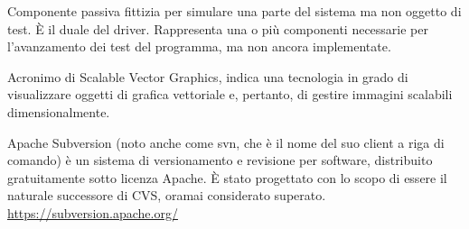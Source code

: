 Componente passiva fittizia per simulare una parte del sistema ma non oggetto di test. \`{E} il duale del driver. Rappresenta una o più componenti necessarie per l’avanzamento dei test del programma, ma non ancora implementate.

Acronimo di Scalable Vector Graphics, indica una tecnologia in grado di visualizzare oggetti di grafica vettoriale e, pertanto, di gestire immagini scalabili dimensionalmente.

Apache Subversion (noto anche come svn, che è il nome del suo client a riga di comando) è un sistema di versionamento e revisione per software, distribuito gratuitamente sotto licenza Apache. \`{E} stato progettato con lo scopo di essere il naturale successore di CVS, oramai considerato superato.\\
\url{https://subversion.apache.org/}
\clearpage
